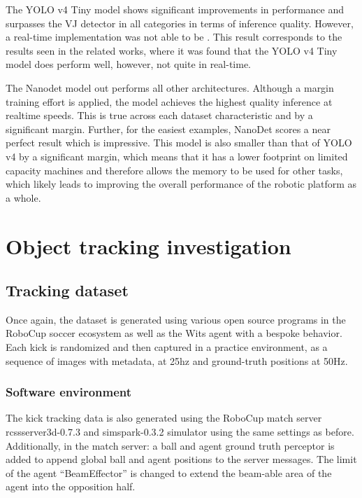 \documentclass[a4paper,twoside,12pt]{report}
\begin{document}
The YOLO v4 Tiny model shows significant improvements in performance and surpasses the VJ detector in all categories in terms of inference quality. However, a real-time implementation was not able to be . This result corresponds to the results seen in the related works, where it was found that the YOLO v4 Tiny model does perform well, however, not quite in real-time.

The Nanodet model out performs all other architectures. Although a margin training effort is applied, the model achieves the highest quality inference at realtime speeds. This is true across each dataset characteristic and by a significant margin. Further, for the easiest examples, NanoDet scores a near perfect result which is impressive. This model is also smaller than that of YOLO v4 by a significant margin, which means that it has a lower footprint on limited capacity machines and therefore allows the memory to be used for other tasks, which likely leads to improving the overall performance of the robotic platform as a whole. 

\chapter{Object tracking investigation}

\section{Tracking dataset}
Once again, the dataset is generated using various open source programs in the RoboCup soccer ecosystem as well as the Wits agent with a bespoke behavior. Each kick is randomized and then captured in a practice environment, as a sequence of images with metadata, at 25hz and ground-truth positions at 50Hz.

\subsection{Software environment}
The kick tracking data is also generated using the RoboCup match server rcssserver3d-0.7.3 and simspark-0.3.2 simulator using the same settings as before. Additionally, in the match server: a ball and agent ground truth perceptor is added to append global ball and agent positions to the server messages. The limit of the agent ``BeamEffector'' is changed to extend the beam-able area of the agent into the opposition half.
\end{document}
